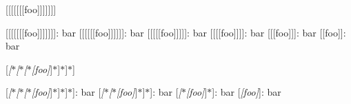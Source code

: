 \mbox{[}\mbox{[}\mbox{[}\mbox{[}\mbox{[}\mbox{[}\mbox{[}foo\mbox{]}\mbox{]}\mbox{]}\mbox{]}\mbox{]}\mbox{]}\mbox{]}

\mbox{[}\mbox{[}\mbox{[}\mbox{[}\mbox{[}\mbox{[}\mbox{[}foo\mbox{]}\mbox{]}\mbox{]}\mbox{]}\mbox{]}\mbox{]}\mbox{]}\+: bar \mbox{[}\mbox{[}\mbox{[}\mbox{[}\mbox{[}\mbox{[}foo\mbox{]}\mbox{]}\mbox{]}\mbox{]}\mbox{]}\mbox{]}\+: bar \mbox{[}\mbox{[}\mbox{[}\mbox{[}\mbox{[}foo\mbox{]}\mbox{]}\mbox{]}\mbox{]}\mbox{]}\+: bar \mbox{[}\mbox{[}\mbox{[}\mbox{[}foo\mbox{]}\mbox{]}\mbox{]}\mbox{]}\+: bar \mbox{[}\mbox{[}\mbox{[}foo\mbox{]}\mbox{]}\mbox{]}\+: bar \mbox{[}\mbox{[}foo\mbox{]}\mbox{]}\+: bar

\mbox{[}{\itshape \mbox{[}$\ast$\mbox{[}$\ast$\mbox{[}$\ast$\mbox{[}foo\mbox{]}}\mbox{]}$\ast$\mbox{]}$\ast$\mbox{]}$\ast$\mbox{]}

\mbox{[}{\itshape \mbox{[}$\ast$\mbox{[}$\ast$\mbox{[}$\ast$\mbox{[}foo\mbox{]}}\mbox{]}$\ast$\mbox{]}$\ast$\mbox{]}$\ast$\mbox{]}\+: bar \mbox{[}{\itshape \mbox{[}$\ast$\mbox{[}$\ast$\mbox{[}foo\mbox{]}}\mbox{]}$\ast$\mbox{]}$\ast$\mbox{]}\+: bar \mbox{[}{\itshape \mbox{[}$\ast$\mbox{[}foo\mbox{]}}\mbox{]}$\ast$\mbox{]}\+: bar \mbox{[}{\itshape \mbox{[}foo\mbox{]}}\mbox{]}\+: bar 